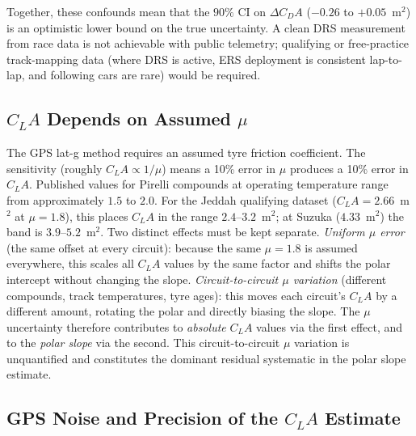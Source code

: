 Together, these confounds mean that the $90\%$ CI on $\Delta C_DA$ ($-0.26$ to $+0.05$~m$^2$) is an optimistic lower bound on the true uncertainty. A clean DRS measurement from race data is not achievable with public telemetry; qualifying or free-practice track-mapping data (where DRS is active, ERS deployment is consistent lap-to-lap, and following cars are rare) would be required.

\subsection[CLA Depends on Assumed mu]{$C_LA$ Depends on Assumed $\mu$}
\label{sec: CLA Depends on Assumed mu}

The GPS lat-g method requires an assumed tyre friction coefficient. The sensitivity (roughly $C_LA \propto 1/\mu$) means a 10\% error in $\mu$ produces a 10\% error in $C_LA$. Published values for Pirelli compounds at operating temperature range from approximately $1.5$ to $2.0$. For the Jeddah qualifying dataset ($C_LA = 2.66$~m$^2$ at $\mu = 1.8$), this places $C_LA$ in the range $2.4$--$3.2$~m$^2$; at Suzuka ($4.33$~m$^2$) the band is $3.9$--$5.2$~m$^2$. Two distinct effects must be kept separate. \emph{Uniform $\mu$ error} (the same offset at every circuit): because the same $\mu = 1.8$ is assumed everywhere, this scales all $C_LA$ values by the same factor and shifts the polar intercept without changing the slope. \emph{Circuit-to-circuit $\mu$ variation} (different compounds, track temperatures, tyre ages): this moves each circuit's $C_LA$ by a different amount, rotating the polar and directly biasing the slope. The $\mu$ uncertainty therefore contributes to \emph{absolute} $C_LA$ values via the first effect, and to the \emph{polar slope} via the second. This circuit-to-circuit $\mu$ variation is unquantified and constitutes the dominant residual systematic in the polar slope estimate.

\subsection{GPS Noise and Precision of the $C_LA$ Estimate}
\label{sec: GPS Noise}

